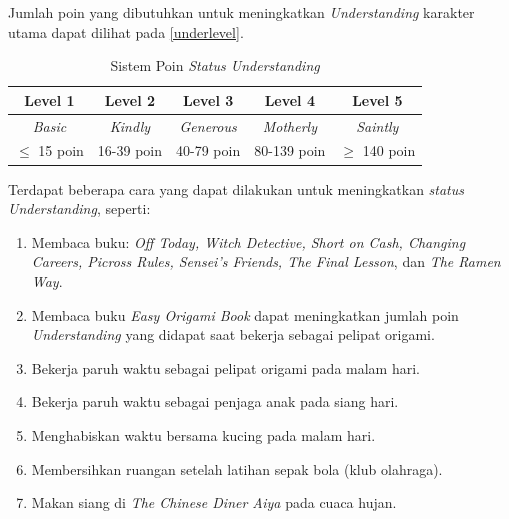 Jumlah poin yang dibutuhkan untuk meningkatkan \textit{Understanding} karakter utama dapat dilihat pada \autoref{underlevel}.
\begin{table}[H]
    \caption{\label{underlevel}Sistem Poin \textit{Status Understanding}}
    \begin{center}
        \begin{tabular}{ | c | c | c | c | c | }
            \hline
            \textbf{Level 1} & \textbf{Level 2} & \textbf{Level 3}  & \textbf{Level 4}  & \textbf{Level 5} \\
            \hline
            \textit{Basic}   & \textit{Kindly}  & \textit{Generous} & \textit{Motherly} & \textit{Saintly} \\
            \hline
            $\le$ 15 poin    & 16-39 poin       & 40-79 poin        & 80-139 poin       & $\ge$ 140 poin   \\
            \hline
        \end{tabular}
    \end{center}
\end{table}

Terdapat beberapa cara yang dapat dilakukan untuk meningkatkan \textit{status Understanding}, seperti:
\begin{enumerate}
    \item Membaca buku: \textit{Off Today, Witch Detective, Short on Cash, Changing Careers, Picross Rules, Sensei’s Friends, The Final Lesson}, dan \textit{The Ramen Way}.
    \item Membaca buku \textit{Easy Origami Book} dapat meningkatkan jumlah poin \textit{Understanding} yang didapat saat bekerja sebagai pelipat origami.
    \item Bekerja paruh waktu sebagai pelipat origami pada malam hari.
    \item Bekerja paruh waktu sebagai penjaga anak pada siang hari.
    \item Menghabiskan waktu bersama kucing pada malam hari.
    \item Membersihkan ruangan setelah latihan sepak bola (klub olahraga).
    \item Makan siang di \textit{The Chinese Diner Aiya} pada cuaca hujan.
\end{enumerate}

